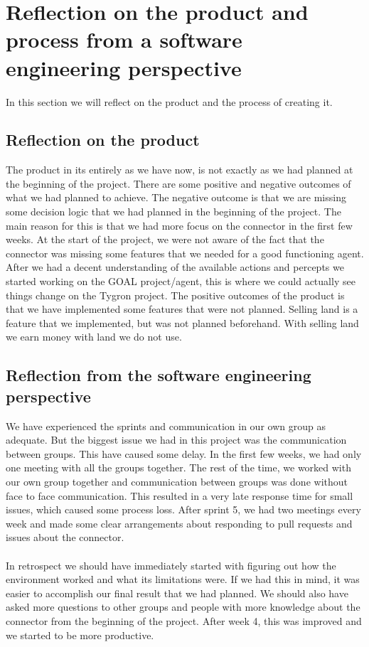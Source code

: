 \chapter{Reflection on the product and process from a software engineering perspective}
In this section we will reflect on the product and the process of creating it.

\section{Reflection on the product}
The product in its entirely as we have now, is not exactly as we had planned at the beginning of the project. There are some positive and negative outcomes of what we had planned to achieve. The negative outcome is that we are missing some decision logic that we had planned in the beginning of the project. The main reason for this is that we had more focus on the connector in the first few weeks. At the start of the project, we were not aware of the fact that the connector was missing some features that we needed for a good functioning agent. After we had a decent understanding of the available actions and percepts we started working on the GOAL project/agent, this is where we could actually see things change on the Tygron project.
The positive outcomes of the product is that we have implemented some features that were not planned. Selling land is a feature that we implemented, but was not planned beforehand. With selling land we earn money with land we do not use. 

\section{Reflection from the software engineering perspective}
We have experienced the sprints and communication in our own group as adequate. But the biggest issue we had in this project was the communication between groups. This have caused some delay. In the first few weeks, we had only one meeting with all the groups together. The rest of the time, we worked with our own group together and communication between groups was done without face to face communication. This resulted in a very late response time for small issues, which caused some process loss. After sprint 5, we had two meetings every week and made some clear arrangements about responding to pull requests and issues about the connector.
\\\\
In retrospect we should have immediately started with figuring out how the environment worked and what its limitations were. If we had this in mind, it was easier to accomplish our final result that we had planned. We should also have asked more questions to other groups and people with more knowledge about the connector from the beginning of the project. After week 4, this was improved and we started to be more productive. 


